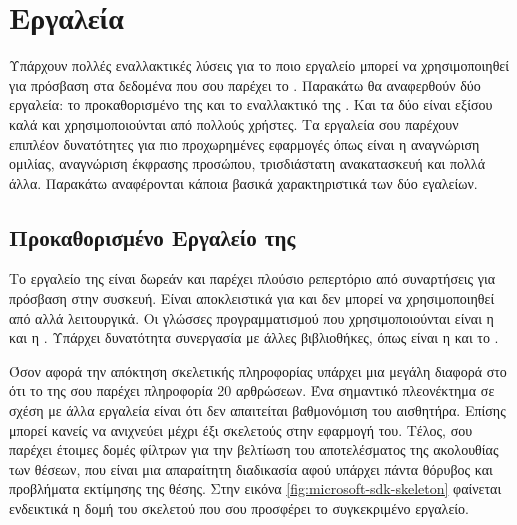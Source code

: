 \section{Εργαλεία}

Υπάρχουν πολλές εναλλακτικές λύσεις για το ποιο εργαλείο μπορεί να χρησιμοποιηθεί για πρόσβαση στα δεδομένα που σου παρέχει το . Παρακάτω θα αναφερθούν δύο εργαλεία: το προκαθορισμένο  της  και το εναλλακτικό της . Και τα δύο είναι εξίσου καλά και χρησιμοποιούνται από πολλούς χρήστες. Τα εργαλεία σου παρέχουν επιπλέον δυνατότητες για πιο προχωρημένες εφαρμογές όπως είναι η αναγνώριση ομιλίας, αναγνώριση έκφρασης προσώπου, τρισδιάστατη ανακατασκευή και πολλά άλλα. Παρακάτω αναφέρονται κάποια βασικά χαρακτηριστικά των δύο εγαλείων.

\subsection{\texorpdfstring{Προκαθορισμένο Εργαλείο της }{}}

Το εργαλείο της  είναι δωρεάν και παρέχει πλούσιο ρεπερτόριο από συναρτήσεις για πρόσβαση στην συσκευή. Είναι αποκλειστικά για  και δεν μπορεί να χρησιμοποιηθεί από αλλά λειτουργικά. Οι γλώσσες προγραμματισμού που χρησιμοποιούνται είναι η  και η . Υπάρχει δυνατότητα συνεργασία με άλλες βιβλιοθήκες, όπως είναι η  και το .

Όσον αφορά την απόκτηση σκελετικής πληροφορίας υπάρχει μια μεγάλη διαφορά στο ότι το  της  σου παρέχει πληροφορία 20 αρθρώσεων. Ένα σημαντικό πλεονέκτημα σε σχέση με άλλα εργαλεία είναι ότι δεν απαιτείται βαθμονόμιση του αισθητήρα. Επίσης μπορεί κανείς να ανιχνεύει μέχρι έξι σκελετούς στην εφαρμογή του. Τέλος, σου παρέχει έτοιμες δομές φίλτρων για την βελτίωση του αποτελέσματος της ακολουθίας των θέσεων, που είναι μια απαραίτητη διαδικασία αφού υπάρχει πάντα θόρυβος και προβλήματα εκτίμησης της θέσης. Στην εικόνα \ref{fig:microsoft-sdk-skeleton} φαίνεται ενδεικτικά η δομή του σκελετού που σου προσφέρει το συγκεκριμένο εργαλείο.

